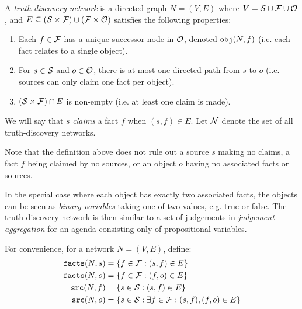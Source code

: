 \documentclass[../main.tex]{subfiles}
\begin{document}
\begin{definition}

A \emph{truth-discovery network} is a directed graph $N = (V, E)$ where $V = \S
\cup \F \cup \O$, and $E \subseteq (\S \times \F) \cup (\F \times \O)$
satisfies the following properties:

\begin{enumerate}
\item Each $f \in \F$ has a unique successor node in $\O$, denoted $\obj(N, f)$
(i.e. each fact relates to a single object).

\item For $s \in \S$ and $o \in \O$, there is at most one directed path from
$s$ to $o$ (i.e. sources can only claim one fact per object).

\item $(\S \times \F) \cap E$ is non-empty (i.e. at least one claim is made).

\end{enumerate}
We will say that $s$ \emph{claims} a fact $f$ when $(s, f) \in E$. Let $\N$
denote the set of all truth-discovery networks.
\end{definition}

\begin{remark}
Note that the definition above does not rule out a source $s$ making no claims,
a fact $f$ being claimed by no sources, or an object $o$ having no associated
facts or sources.

In the special case where each object has exactly two associated facts, the
objects can be seen as \emph{binary variables} taking one of two values, e.g.
true or false. The truth-discovery network is then similar to a set of
judgements in \emph{judgement aggregation}\cite{handbook_ja} for an agenda
consisting only of propositional variables.
\end{remark}

\begin{notation}
For convenience, for a network $N=(V, E)$, define:
\begin{align*}
    \fact(N, s) &= \{f \in \F : (s, f) \in E\} \\
    \fact(N, o) &= \{f \in \F : (f, o) \in E\} \\
    \src(N, f) &= \{s \in \S : (s, f) \in E\} \\
    \src(N, o) &= \{s \in \S : \exists f \in \F : (s, f), (f, o) \in E\} \\
\end{align*}
\end{notation}
\end{document}
